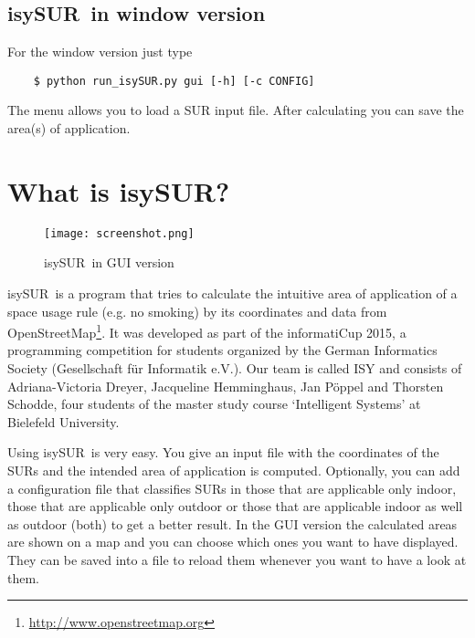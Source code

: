 \documentclass[11pt,fleqn]{book} %
\newcommand{\ProjectTitle}{isySUR}
\newcommand{\pt}{\ProjectTitle}
\begin{document}
\subsection{\ProjectTitle\ in window version}\label{sec:QuickstartWindow}
For the window version just type
\begin{verbatim}
	$ python run_isySUR.py gui [-h] [-c CONFIG]
\end{verbatim}
The menu allows you to load a SUR input file. After calculating you can save the area(s) of application.

\section{What is \ProjectTitle?}\label{sec:whatFor}
\begin{figure}
\centering
\texttt{[image: screenshot.png]}
\caption{\pt\ in GUI version}
\end{figure}
\pt\ is a program that tries to calculate the intuitive area of application of a space usage rule (e.g. no smoking) by its coordinates and data from OpenStreetMap\footnote{\url{http://www.openstreetmap.org}}. It was developed as part of the informatiCup 2015, a programming competition for students organized by the German Informatics Society (Gesellschaft für Informatik e.V.). Our team is called ISY and consists of Adriana-Victoria Dreyer, Jacqueline Hemminghaus, Jan Pöppel and Thorsten Schodde, four students of the master study course `Intelligent Systems' at Bielefeld University.

Using \pt\ is very easy. You give an input file with the coordinates of the SURs and the intended area of application is computed. Optionally, you can add a configuration file that classifies SURs in those that are applicable only indoor, those that are applicable only outdoor or those that are applicable indoor as well as outdoor (both) to get a better result. In the GUI version the calculated areas are shown on a map and you can choose which ones you want to have displayed. They can be saved into a file to reload them whenever you want to have a look at them.
\end{document}
